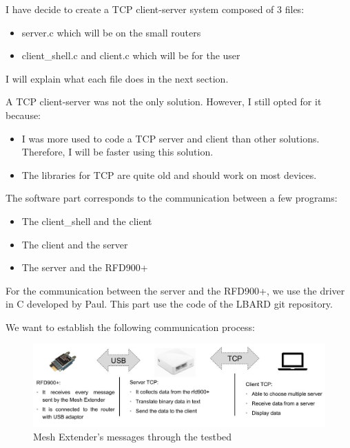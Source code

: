 I have decide to create a TCP client-server system composed of 3 files:
\begin{itemize}
	\item server.c which will be on the small routers
	\item client\_shell.c and client.c which will be for the user
\end{itemize}

I will explain what each file does in the next section.


A TCP client-server was not the only solution. However, I still opted for it because:
\begin{itemize}
	\item I was more used to code a TCP server and client than other solutions. Therefore, I will be faster using this solution.
	\item The libraries for TCP are quite old and should work on most devices.
\end{itemize}


The software part corresponds to the communication between a few programs:
\begin{itemize}
	\item The client\_shell and the client
	\item The client and the server
	\item The server and the RFD900+
\end{itemize}

For the communication between the server and the RFD900+, we use the driver in C developed by Paul. This part use the code of the LBARD git repository.

\hfill \break

We want to establish the following communication process:
\begin{figure}[H]
\begin{center}
\includegraphics[width=\textwidth]{image/GlobalUHF.jpg}%
\caption{Mesh Extender's messages through the testbed}%
\label{figure:UHFmesh}%
\end{center}
\end{figure}

\hfill \break



